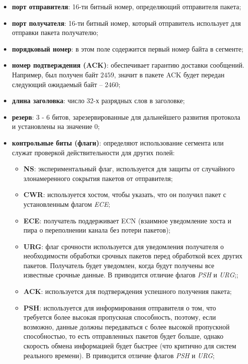 \begin{itemize}
	\item \textbf{порт отправителя}: 16-ти битный номер, определяющий отправителя пакета;
	\item \textbf{порт получателя}: 16-ти битный номер, который отправитель использует для отправки пакета получателю;
	\item \textbf{порядковый номер}: в этом поле содержится первый номер байта в сегменте;
	\item \textbf{номер подтверждения (ACK)}: обеспечивает гарантию доставки сообщений. Например, был получен байт $2459$, значит в пакете ACK будет передан следующий ожидаемый байт -- $2460$;
	\item \textbf{длина заголовка}: число 32-х разрядных слов в заголовке;
	\item \textbf{резерв}: 3 - 6 битов, зарезервированные для дальнейшего развития протокола и установлены на значение 0;
	\item \textbf{контрольные биты (флаги)}: определяют использование сегмента или служат проверкой действительности для других полей:
	\begin{itemize}
		\item \textbf{NS}: экспериментальный флаг, используется для защиты от случайного злонамеренного сокрытия пакетов от отправителя;
		\item \textbf{CWR}: используется хостом, чтобы указать, что он получил пакет с установленным флагом \textit{ECE};
		\item \textbf{ECE}: получатель поддерживает ECN (взаимное уведомление хоста и пира о переполнении канала без потери пакетов);
		\item \textbf{URG}: флаг срочности используется для уведомления получателя о необходимости обработки срочных пакетов перед обработкой всех других пакетов. Получатель будет уведомлен, когда будут получены все известные срочные данные. В  приводится отличие флагов \textit{PSH} и \textit{URG};;
		\item \textbf{ACK}: используется для подтверждения успешного получения пакета;
		\item \textbf{PSH}: используется для информирования отправителя о том, что требуется более высокая пропускная способность, поэтому, если возможно, данные должны передаваться с более высокой пропускной способностью, то есть отправленных пакетов будет больше, однако скорость обмена информацией будет быстрее (что критично для систем реального времени). В  приводится отличие флагов \textit{PSH} и \textit{URG};

\end{itemize}
\end{itemize}
